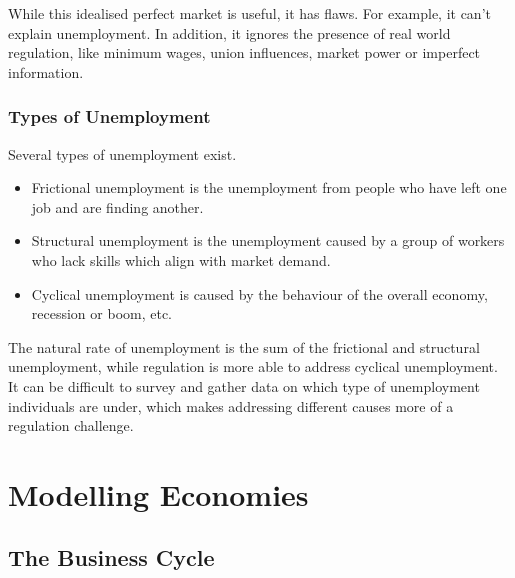 \documentclass[12pt]{report}
\begin{document}
\begin{flushleft}
\bigskip
While this idealised perfect market is useful, it has flaws. For example, it
can't explain unemployment. In addition, it ignores the presence of real world
regulation, like minimum wages, union influences, market power or imperfect
information.

\subsubsection*{Types of Unemployment}

Several types of unemployment exist.
\begin{itemize}
    \item Frictional unemployment is the unemployment from people who have left
        one job and are finding another.
    \item Structural unemployment is the unemployment caused by a group of 
        workers who lack skills which align with market demand.
    \item Cyclical unemployment is caused by the behaviour of the overall 
        economy, recession or boom, etc.
\end{itemize}

The natural rate of unemployment is the sum of the frictional and structural
unemployment, while regulation is more able to address cyclical unemployment. 
It can be difficult to survey and gather data on which type of unemployment
individuals are under, which makes addressing different causes more of a 
regulation challenge.

\section*{Modelling Economies}

\subsection*{The Business Cycle}


\end{flushleft}
\end{document}
